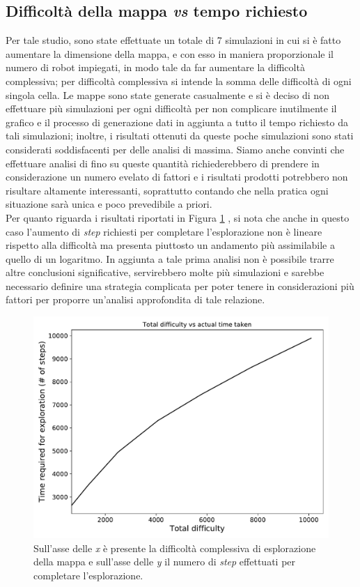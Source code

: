 \subsection{Difficoltà della mappa \textit{vs} tempo richiesto}
Per tale studio, sono state effettuate un totale di 7 simulazioni in cui si è fatto aumentare la dimensione della mappa, e con esso in maniera proporzionale il numero di robot impiegati, in modo tale da far aumentare la difficoltà complessiva; per difficoltà complessiva si intende la somma delle difficoltà di ogni singola cella.
Le mappe sono state generate casualmente e si è deciso di non effettuare più simulazioni per ogni difficoltà per non complicare inutilmente il grafico e il processo di generazione dati in aggiunta a tutto il tempo richiesto da tali simulazioni; inoltre, i risultati ottenuti da queste poche simulazioni sono stati considerati soddisfacenti per delle analisi di massima.
Siamo anche convinti che effettuare analisi di fino su queste quantità richiederebbero di prendere in considerazione un numero evelato di fattori e i risultati prodotti potrebbero non risultare altamente interessanti, soprattutto contando che nella pratica ogni situazione sarà unica e poco prevedibile a priori.\\
Per quanto riguarda i risultati riportati in Figura \ref{fig:difficulty} , si nota che anche in questo caso l'aumento di \textit{step} richiesti per completare l'esplorazione non è lineare rispetto alla difficoltà ma presenta piuttosto un andamento più assimilabile a quello di un logaritmo.
In aggiunta a tale prima analisi non è possibile trarre altre conclusioni significative, servirebbero molte più simulazioni e sarebbe necessario definire una strategia complicata per poter tenere in considerazioni più fattori per proporre un'analisi approfondita di tale relazione.
\begin{figure}
	\centering
	\includegraphics[width=0.9\linewidth]{images/macro_results/difficulty}
	\caption{Sull'asse delle \textit{x} è presente la difficoltà complessiva di esplorazione della mappa e sull'asse delle \textit{y} il numero di \textit{step} effettuati per completare l'esplorazione.}
	\label{fig:difficulty}
\end{figure}
